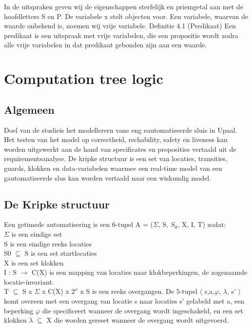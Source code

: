 \documentclass{article}
\begin{document}
	
	
	In de uitspraken geven wij de eigenschappen sterfelijk en priemgetal aan met de hoofdletters
	S en P. De variabele x stelt objecten voor. Een variabele, waarvan de waarde onbekend
	is, noemen wij vrije variabele.
	Definitie 4.1 (Predikaat) Een predikaat is een uitspraak met vrije variabelen, die een
	propositie wordt zodra alle vrije variabelen in dat predikaat gebonden zijn aan een waarde.
	
	
	\section{Computation tree logic}
	
	\subsection{Algemeen}
	Doel van de studieis het modellerern vane eng eautomatiseerde sluis in Upaal. Het testen van het model op correctheid, rechability, safety en liveness kan worden uitgewerkt aan de hand van specificates en proposities vertaald uit de requirementsanalyse. De kripke structuur is een set van locaties, transities, guards, klokken en data-variabelen waarmee een real-time model van een gautomatiseerde slus kan worden vertaald naar een wiskundig model.
	
	\subsection{De Kripke structuur}
	Een getimede automatisering is een 6-tupel A = ($\Sigma$, S, $S_0$, X, I, T) zodat: \\
	$\Sigma$ is een eindige set \\
	S is een eindige reeks locaties \\
	S0 $\subseteq$ S is een set startlocaties \\
	X is een set klokken \\
	I : S $\rightarrow$ C(X) is een mapping van locaties naar klokbeperkingen, de zogenaamde locatie-invariant. \\
	T $\subseteq$ S x $\Sigma$ x C(X) x $2^{x}$ x S is een reeks overgangen. De 5-tupel $\langle$ s,a,$\varphi$, $\lambda$, s' $\rangle$ komt overeen met een overgang van locatie s naar locaties s' gelabeld met a, een beperking $\varphi$ die specificeert wanneer de overgang wordt ingeschakeld, en een set klokken $\lambda$ $\subseteq$ X die worden gereset wanneer de overgang wordt uitgevoerd. \\
	
\end{document}
